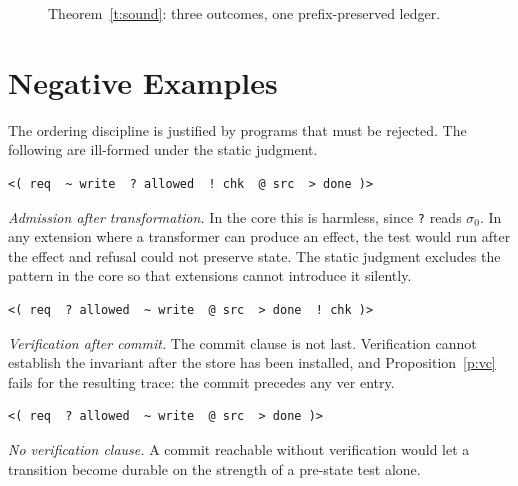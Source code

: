 \documentclass[11pt]{article}
\newcommand{\code}[1]{\texttt{#1}}
\newcommand{\pre}{\preceq}
\begin{document}
\begin{figure}[h]
\centering
{}
\caption{Theorem~\ref{t:sound}: three outcomes, one prefix-preserved ledger.}
\end{figure}

\section{Negative Examples}\label{s:neg}

The ordering discipline is justified by programs that must be rejected. The following are ill-formed under the static judgment.

\begin{Verbatim}
<( req  ~ write  ? allowed  ! chk  @ src  > done )>
\end{Verbatim}
\emph{Admission after transformation.} In the core this is harmless, since \code{?} reads $\sigma_0$. In any extension where a transformer can produce an effect, the test would run after the effect and refusal could not preserve state. The static judgment excludes the pattern in the core so that extensions cannot introduce it silently.

\begin{Verbatim}
<( req  ? allowed  ~ write  @ src  > done  ! chk )>
\end{Verbatim}
\emph{Verification after commit.} The commit clause is not last. Verification cannot establish the invariant after the store has been installed, and Proposition~\ref{p:vc} fails for the resulting trace: the commit precedes any \textsf{ver} entry.

\begin{Verbatim}
<( req  ? allowed  ~ write  @ src  > done )>
\end{Verbatim}
\emph{No verification clause.} A commit reachable without verification would let a transition become durable on the strength of a pre-state test alone.
\end{document}

